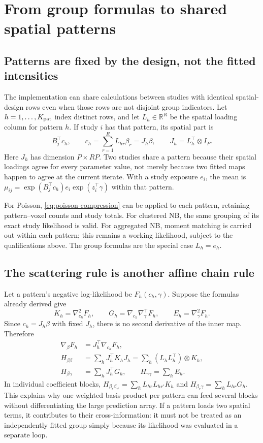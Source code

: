 \documentclass[11pt,a4paper]{article}
\newcommand{\R}{\mathbb R}
\numberwithin{equation}{section}
\begin{document}
\section{From group formulas to shared spatial patterns}
\label{sec:patterns}

\subsection{Patterns are fixed by the design, not the fitted intensities}
The implementation can share calculations between studies with
identical spatial-design rows even when those rows are not disjoint
group indicators. Let $h=1,\ldots,K_{\rm pat}$ index distinct rows,
and let $L_h\in\R^R$ be the spatial loading column for pattern $h$.
If study $i$ has that pattern, its spatial part is
\[
 B_j^\top c_h,\qquad
 c_h=\sum_{r=1}^RL_{hr}\beta_r=J_h\beta,\qquad
 J_h=L_h^\top\otimes I_P .
\]
Here $J_h$ has dimension $P\times RP$.
Two studies share a pattern because their spatial loadings agree
for every parameter value, not merely because two fitted maps happen
to agree at the current iterate.
With a study exposure $e_i$, the mean is
$\mu_{ij}=\exp(B_j^\top c_h)e_i\exp(z_i^\top\gamma)$ within that pattern.

For Poisson, \eqref{eq:poisson-compression} can be applied to each
pattern, retaining pattern--voxel counts and study totals.
For clustered NB, the same grouping of its exact study likelihood is valid.
For aggregated NB, moment matching is carried out within each pattern;
this remains a working likelihood, subject to the qualifications above.
The group formulas are the special case $L_h=e_h$.

\subsection{The scattering rule is another affine chain rule}
Let a pattern's negative log-likelihood be $F_h(c_h,\gamma)$.
Suppose the formulas already derived give
\[
 K_h=\nabla_{c_h}^2F_h,\qquad
 G_h=\nabla_{c_h}\nabla_\gamma^\top F_h,\qquad
 E_h=\nabla_\gamma^2F_h .
\]
Since $c_h=J_h\beta$ with fixed $J_h$, there is no second derivative
of the inner map. Therefore
\begin{align}
 \nabla_\beta F_h&=J_h^\top\nabla_{c_h}F_h,\\
 H_{\beta\beta}&=\sum_hJ_h^\top K_hJ_h
       =\sum_h(L_hL_h^\top)\otimes K_h,\\
 H_{\beta\gamma}&=\sum_hJ_h^\top G_h,\qquad
 H_{\gamma\gamma}=\sum_hE_h.
 \label{eq:pattern-scatter}
\end{align}
In individual coefficient blocks,
$H_{\beta_r\beta_{r'}}=\sum_h L_{hr}L_{hr'}K_h$ and
$H_{\beta_r\gamma}=\sum_h L_{hr}G_h$.
This explains why one weighted basis product per pattern can feed
several blocks without differentiating the large prediction array.
If a pattern loads two spatial terms, it contributes to their
cross-information: it must not be treated as an independently fitted
group simply because its likelihood was evaluated in a separate loop.
\end{document}
